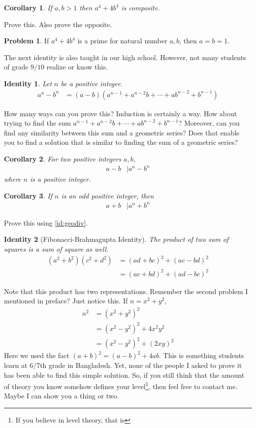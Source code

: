\documentclass[a4paper, leqno]{article}
\newtheorem{identity}{Identity}
\newtheorem{corollary}{Corollary}
\theoremstyle{definition}
\newtheorem{problem}{Problem}
\theoremstyle{remark}
\begin{document}
			\begin{corollary}
				If $a,b>1$ then $a^4+4b^4$ is composite.
			\end{corollary}
		Prove this. Also prove the opposite.
			\begin{problem}
				If $a^4+4b^4$ is a prime for natural number $a,b$, then $a=b=1$.
			\end{problem}
		The next identity is also taught in our high school. However, not many students of grade $9/10$ realize or know this.
			\begin{identity}\label{id:geodiv}
				Let $n$ be a positive integer.
					\begin{align*}
						a^n-b^n & = (a-b)(a^{n-1}+a^{n-2}b+\cdots+ab^{n-2}+b^{n-1})
					\end{align*}
			\end{identity}
		How many ways can you prove this? Induction is certainly a way. How about trying to find the sum $a^{n-1}+a^{n-2}b+\cdots+ab^{n-2}+b^{n-1}$? Moreover, can you find any similarity between this sum and a geometric series? Does that enable you to find a solution that is similar to finding the sum of a geometric series?
			\begin{corollary}
				For two positive integers $a,b$,
					\begin{align*}
						a-b & |a^n-b^n
					\end{align*}
				where $n$ is a positive integer.
			\end{corollary}
			
			\begin{corollary}
				If $n$ is an odd positive integer, then
					\begin{align*}
						a+b & |a^n+b^n
					\end{align*}
			\end{corollary}
		Prove this using \eqref{id:geodiv}.
			\begin{identity}[Fibonacci-Brahmagupta Identity]\label{id:fib}
				The product of two sum of squares is a sum of square as well.
					\begin{align*}
						(a^2+b^2)(c^2+d^2) & = (ad+bc)^2+(ac-bd)^2\\
											&= (ac+bd)^2+(ad-bc)^2
					\end{align*}
			\end{identity}
		Note that this product has two representations. Remember the second problem I mentioned in preface? Just notice this. If $n=x^2+y^2$,
			\begin{align*}
				n^2 & = (x^2+y^2)^2\\
					& = (x^2-y^2)^2+4x^2y^2\\
					& = (x^2-y^2)^2+(2xy)^2
			\end{align*}
		Here we used the fact $(a+b)^2=(a-b)^2+4ab$. This is something students learn at $6/7$th grade in Bangladesh. Yet, none of the people I asked to prove it has been able to find this simple solution. So, if you still think that the amount of theory you know somehow defines your level\footnote{If you believe in level theory, that is}, then feel free to contact me. Maybe I can show you a thing or two.
		
\end{document}
